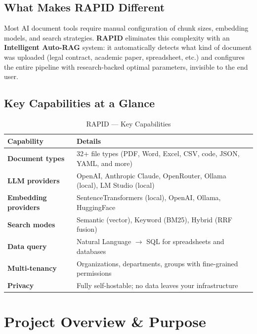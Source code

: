 \documentclass[12pt, a4paper, oneside]{report}
\newcommand{\rapidsys}{\textbf{\color{rapidblue}RAPID}}
\begin{document}
\section*{What Makes RAPID Different}

Most AI document tools require manual configuration of chunk sizes, embedding models, and
search strategies. \rapidsys{} eliminates this complexity with an \textbf{Intelligent
Auto-RAG} system: it automatically detects what kind of document was uploaded (legal
contract, academic paper, spreadsheet, etc.) and configures the entire pipeline with
research-backed optimal parameters, invisible to the end user.

\section*{Key Capabilities at a Glance}

\begin{table}[H]
\centering
{}
\begin{tabularx}{\linewidth}{>{\bfseries}lX}
\toprule
\rowcolor{rapidblue!10}
Capability & Details \\
\midrule
Document types & 32+ file types (PDF, Word, Excel, CSV, code, JSON, YAML, and more) \\
LLM providers & OpenAI, Anthropic Claude, OpenRouter, Ollama (local), LM Studio (local) \\
Embedding providers & SentenceTransformers (local), OpenAI, Ollama, HuggingFace \\
Search modes & Semantic (vector), Keyword (BM25), Hybrid (RRF fusion) \\
Data query & Natural Language \(\rightarrow\) SQL for spreadsheets and databases \\
Multi-tenancy & Organizations, departments, groups with fine-grained permissions \\
Privacy & Fully self-hostable; no data leaves your infrastructure \\
\bottomrule
\end{tabularx}
\caption{RAPID — Key Capabilities}
\end{table}

\chapter{Project Overview \& Purpose}
\end{document}
